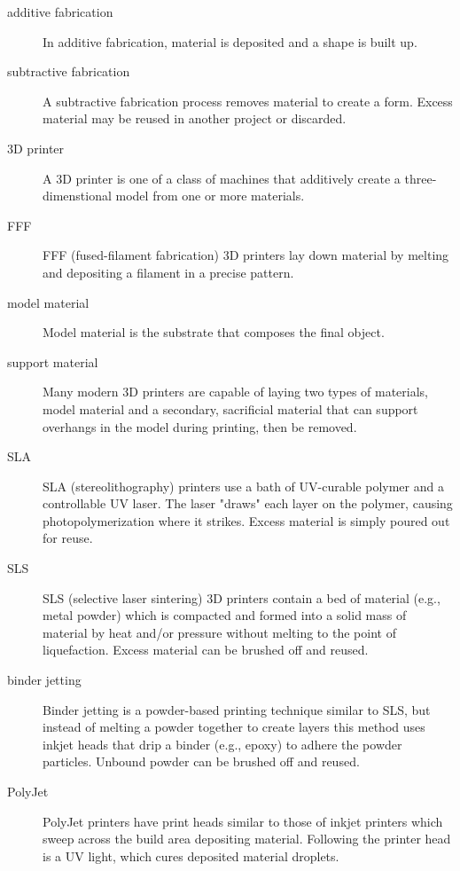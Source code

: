 \begin{description}

\item[additive fabrication] In additive fabrication, material is deposited and a shape is built up.

\item[subtractive fabrication] A subtractive fabrication process removes material to create a form. Excess material may be reused in another project or discarded.

\item[3D printer] A 3D printer is one of a class of machines that additively create a three-dimenstional model from one or more materials.

\item[FFF] FFF (fused-filament fabrication) 3D printers lay down material by melting and depositing a filament in a precise pattern.

\item[model material] Model material is the substrate that composes the final object.

\item[support material] Many modern 3D printers are capable of laying two types of materials, model material and a secondary, sacrificial material that can support overhangs in the model during printing, then be removed.

\item[SLA] SLA (stereolithography) printers use a bath of UV-curable polymer and a controllable UV laser. The laser "draws" each layer on the polymer, causing photopolymerization where it strikes. Excess material is simply poured out for reuse.

\item[SLS] SLS (selective laser sintering) 3D printers contain a bed of material (e.g., metal powder) which is compacted and formed into a solid mass of material by heat and/or pressure without melting to the point of liquefaction. Excess material can be brushed off and reused.

\item[binder jetting] Binder jetting is a powder-based printing technique similar to SLS, but instead of melting a powder together to create layers this method uses inkjet heads that drip a binder (e.g., epoxy) to adhere the powder particles. Unbound powder can be brushed off and reused.

\item[PolyJet] PolyJet printers have print heads similar to those of inkjet printers which sweep across the build area depositing material. Following the printer head is a UV light, which cures deposited material droplets.


\end{description}

